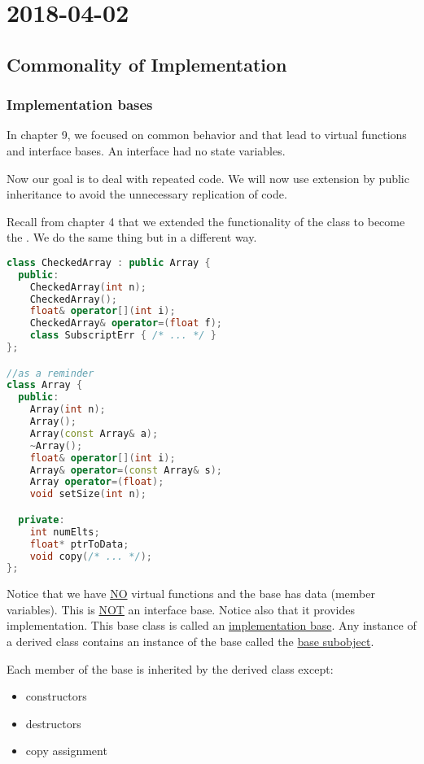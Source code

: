 \section{2018-04-02}

\subsection{Commonality of Implementation}

\subsubsection{Implementation bases}

In chapter 9, we focused on common behavior and that lead to virtual functions and interface bases. An interface had no state variables.

Now our goal is to deal with repeated code. We will now use extension by public inheritance to avoid the unnecessary replication of code.

Recall from chapter 4 that we extended the functionality of the  class to become the . We do the same thing but in a different way.

\begin{lstlisting}[language=C++]
class CheckedArray : public Array {
  public:
    CheckedArray(int n);
    CheckedArray();
    float& operator[](int i);
    CheckedArray& operator=(float f);
    class SubscriptErr { /* ... */ }
};

//as a reminder
class Array {
  public:
    Array(int n);
    Array();
    Array(const Array& a);
    ~Array();
    float& operator[](int i);
    Array& operator=(const Array& s);
    Array operator=(float);
    void setSize(int n);

  private:
    int numElts;
    float* ptrToData;
    void copy(/* ... */);
};
\end{lstlisting}

Notice that we have \underline{NO} virtual functions and the base has data (member variables). This is \underline{NOT} an interface base. Notice also that it provides implementation. This base class is called an \underline{implementation base}. Any instance of a derived class contains an instance of the base called the \underline{base subobject}. 

Each member of the base is inherited by the derived class except:

\begin{itemize}
  \item constructors
  \item destructors
  \item copy assignment
\end{itemize}

